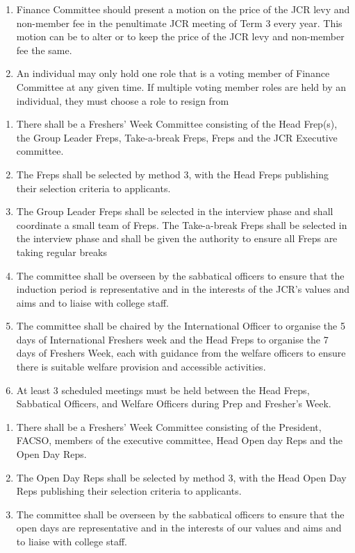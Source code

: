 \begin{enumerate}
    \item Finance Committee should present a motion on the price of the JCR levy and non-member fee in the penultimate JCR meeting of Term 3 every year. This motion can be to alter or to keep the price of the JCR levy and non-member fee the same.
    \item An individual may only hold one role that is a voting member of Finance Committee at any given time. If multiple voting member roles are held by an individual, they must choose a role to resign from
\end{enumerate}



\begin{enumerate}
    \item There shall be a Freshers’ Week Committee consisting of the Head Frep(s), the Group Leader Freps, Take-a-break Freps, Freps and the JCR Executive committee.
    \item The Freps shall be selected by method 3, with the Head Freps publishing their selection criteria to applicants.
    \item The Group Leader Freps shall be selected in the interview phase and shall coordinate a small team of Freps.
    The Take-a-break Freps shall be selected in the interview phase and shall be given the authority to ensure all Freps are taking regular breaks 
    \item The committee shall be overseen by the sabbatical officers to ensure that the induction period is representative and in the interests of the JCR’s values and aims and to liaise with college staff.
    \item The committee shall be chaired by the International Officer to organise the 5 days of International Freshers week and the Head Freps to organise the 7 days of Freshers Week, each with guidance from the welfare officers to ensure there is suitable welfare provision and accessible activities.
    \item At least 3 scheduled meetings must be held between the Head Freps, Sabbatical Officers, and Welfare Officers during Prep and Fresher's Week.
\end{enumerate}


\begin{enumerate}
    \item There shall be a Freshers’ Week Committee consisting of the President, FACSO, members of the executive committee, Head Open day Reps and the Open Day Reps.
    \item The Open Day Reps shall be selected by method 3, with the Head Open Day Reps publishing their selection criteria to applicants.
    \item The committee shall be overseen by the sabbatical officers to ensure that the open days are representative and in the interests of our values and aims and to liaise with college staff.
\end{enumerate}

